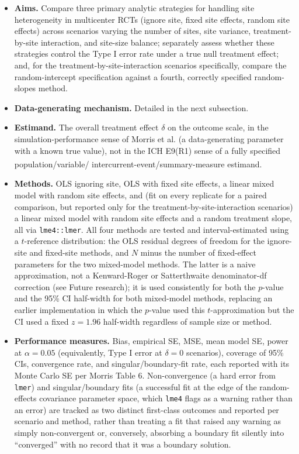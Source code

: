 \documentclass[
  11pt,
]{article}
\providecommand{\tightlist}{%
  \setlength{\itemsep}{0pt}\setlength{\parskip}{0pt}}
\begin{document}
\begin{itemize}
\tightlist
\item
  \textbf{Aims.} Compare three primary analytic strategies for handling
  site heterogeneity in multicenter RCTs (ignore site, fixed site
  effects, random site effects) across scenarios varying the number
  of sites, site variance, treatment-by-site interaction, and
  site-size balance; separately assess whether these strategies
  control the Type I error rate under a true null treatment effect;
  and, for the treatment-by-site-interaction scenarios specifically,
  compare the random-intercept specification against a fourth,
  correctly specified random-slopes method.
\item
  \textbf{Data-generating mechanism.} Detailed in the next subsection.
\item
  \textbf{Estimand.} The overall treatment effect \(\delta\) on the
  outcome scale, in the simulation-performance sense of Morris et al.
  (a data-generating parameter with a known true value), not in the
  ICH E9(R1) sense of a fully specified population/variable/
  intercurrent-event/summary-measure estimand\textsuperscript{}.
\item
  \textbf{Methods.} OLS ignoring site, OLS with fixed site effects, a
  linear mixed model with random site effects, and (fit on every
  replicate for a paired comparison, but reported only for the
  treatment-by-site-interaction scenarios) a linear mixed model with
  random site effects and a random treatment slope, all via
  \texttt{lme4::lmer}. All four methods are tested and
  interval-estimated using a \(t\)-reference distribution: the OLS
  residual degrees of freedom for the ignore-site and fixed-site
  methods, and \(N\) minus the number of fixed-effect parameters for
  the two mixed-model methods. The latter is a naive approximation,
  not a Kenward-Roger or Satterthwaite denominator-df correction (see
  Future research); it is used consistently for both the \(p\)-value
  and the 95\% CI half-width for both mixed-model methods, replacing
  an earlier implementation in which the \(p\)-value used this
  \(t\)-approximation but the CI used a fixed \(z = 1.96\) half-width
  regardless of sample size or method.
\item
  \textbf{Performance measures.} Bias, empirical SE, MSE, mean model SE,
  power at \(\alpha = 0.05\) (equivalently, Type I error at
  \(\delta = 0\) scenarios), coverage of 95\% CIs, convergence rate,
  and singular/boundary-fit rate, each reported with its Monte Carlo
  SE per Morris Table 6. Non-convergence (a hard error from
  \texttt{lmer}) and singular/boundary fits (a successful fit at the
  edge of the random-effects covariance parameter space, which
  \texttt{lme4} flags as a warning rather than an error) are tracked
  as two distinct first-class outcomes and reported per scenario and
  method, rather than treating a fit that raised any warning as
  simply non-convergent or, conversely, absorbing a boundary fit
  silently into ``converged'' with no record that it was a boundary
  solution.
\end{itemize}
\end{document}
